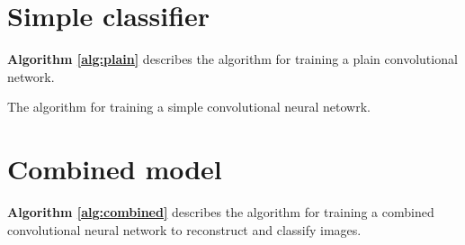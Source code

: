 \documentclass{l4proj}
\begin{document}
\section{Simple classifier}
\textbf{Algorithm \ref{alg:plain}} describes the algorithm for training a plain convolutional network.
\begin{algorithm}
    \DontPrintSemicolon
    \CommentSty{\color{black}}
    
\caption{The algorithm for training a simple convolutional neural netowrk. }\label{alg:plain}
\end{algorithm}


\section{Combined model}
\textbf{Algorithm \ref{alg:combined}} describes the algorithm for training a combined convolutional neural network to reconstruct and classify images.
\end{document}
